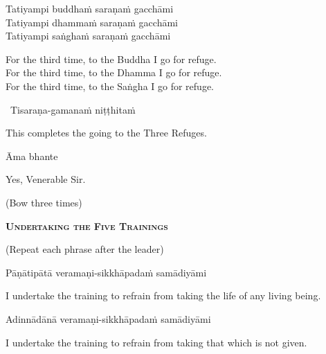 Tatiyampi buddhaṁ saraṇaṁ gacchāmi\\
Tatiyampi dhammaṁ saraṇaṁ gacchāmi\\
Tatiyampi saṅghaṁ saraṇaṁ gacchāmi

\begin{english-verses}
  For the third time, to the Buddha I go for refuge.\\
  For the third time, to the Dhamma I go for refuge.\\
  For the third time, to the Saṅgha I go for refuge.
\end{english-verses}

\anglebracketleft\ \hspace{-0.5mm}Tisaraṇa-gamanaṁ niṭṭhitaṁ \hspace{-0.5mm}\anglebracketright\

\begin{english}
  This completes the going to the Three Refuges.
\end{english}

Āma bhante

\begin{english}
  Yes, Venerable Sir.
\end{english}

\begin{center}
(Bow three times)
\end{center}

\clearpage

\begin{center}
  \textbf{\textsc{Undertaking the Five Trainings}}
\end{center}

\begin{center}
  (Repeat each phrase after the leader)
\end{center}

Pāṇātipātā veramaṇi-sikkhāpadaṁ samādiyāmi

\begin{english-hang}
  I undertake the training\hyperlink{endnote139-appendix}{\hypertarget{endnote139-body}{}}
  to refrain from taking the life of any living being.
\end{english-hang}

Adinnādānā veramaṇi-sikkhāpadaṁ samādiyāmi

\begin{english}
  I undertake the training to refrain from taking that which is not given.
\end{english}

